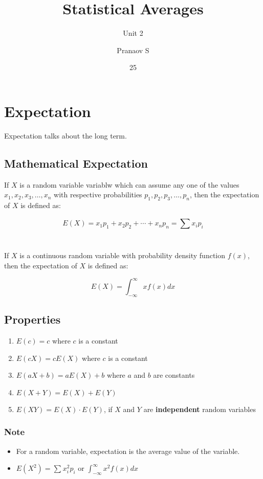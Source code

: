 \documentclass[english,course]{lecture}
\title{Statistical Averages}
\subtitle{Unit 2}
\author{Pranaov S}
\date{25}{02}{2025}
\begin{document}
\newpage

\section{Expectation}

Expectation talks about the long term.

\subsection{Mathematical Expectation}

If $X$ is a random variable variablw which can assume any one of the values $x_{1}, x_{2}, x_{3}, \dots, x_{n}$
with respective probabilities $p_1, p_2, p_3, \dots, p_n$, then the expectation of $X$ is defined as:

\[
  E(X) = x_{1}p_1 + x_{2} p_2 + \cdots + x_n p_n = \sum_{}^{}x_i p_i
\]

\\

If $X$ is a continuous random variable with probability density function $f(x)$, then the expectation of $X$ is defined as:

\[
  E(X) = \int_{-\infty}^{\infty} x f(x) dx
\]

\subsection{Properties}

\begin{enumerate}
    \item $E(c) = c$ where $c$ is a constant
    \item $E(cX) = cE(X)$ where $c$ is a constant
    \item $E(aX + b) = aE(X) + b$ where $a$ and $b$ are constants
    \item $E(X + Y) = E(X) + E(Y)$
    \item $E(XY) = E(X) \cdot E(Y)$, if $X$ and $Y$ are \textbf{independent} random variables
\end{enumerate}

\subsubsection*{Note}

\begin{itemize}
  \item For a random variable, expectation is the average value of the variable.
  \item $E(X^2) = \sum_{}^{}x_i^2 p_i$ or $\int_{-\infty}^{\infty} x^2 f(x) dx$
\end{itemize}
\end{document}
